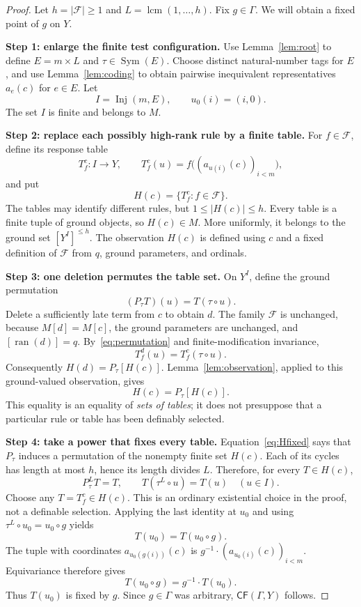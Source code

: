 \documentclass[11pt,letterpaper]{article}
\theoremstyle{definition}
\numberwithin{equation}{section}
\newcommand{\ran}{\operatorname{ran}}
\newcommand{\lcm}{\operatorname{lcm}}
\newcommand{\CF}{\mathsf{CF}}
\DeclareMathOperator{\Sym}{Sym}
\DeclareMathOperator{\Inj}{Inj}
\begin{document}
\begin{proof}
Let $h=|\mathcal F|\ge1$ and $L=\lcm(1,\ldots,h)$. Fix $g\in\Gamma$.
We will obtain a fixed point of $g$ on $Y$.

\textbf{Step 1: enlarge the finite test configuration.}
Use Lemma~\ref{lem:root} to define $E=m\times L$ and $\tau\in\Sym(E)$.
Choose distinct natural-number tags for $E$, and use
Lemma~\ref{lem:coding} to obtain pairwise inequivalent representatives
$a_e(c)$ for $e\in E$. Let
\[
 I=\Inj(m,E),\qquad u_0(i)=(i,0).
\]
The set $I$ is finite and belongs to $M$.

\textbf{Step 2: replace each possibly high-rank rule by a finite table.}
For $f\in\mathcal F$, define its response table
\[
 T_f^c:I\longrightarrow Y,\qquad
 T_f^c(u)=f\bigl((a_{u(i)}(c))_{i<m}\bigr),
\]
and put
\[
 H(c)=\{T_f^c:f\in\mathcal F\}.
\]
The tables may identify different rules, but
$1\le |H(c)|\le h$. Every table is a finite tuple of ground objects,
so $H(c)\in M$. More uniformly, it belongs to the ground set
$[Y^I]^{\le h}$. The observation $H(c)$ is defined using $c$ and a fixed
definition of $\mathcal F$ from $q$, ground parameters, and ordinals.

\textbf{Step 3: one deletion permutes the table set.}
On $Y^I$, define the ground permutation
\[
 (P_\tau T)(u)=T(\tau\circ u).
\]
Delete a sufficiently late term from $c$ to obtain $d$. The family
$\mathcal F$ is unchanged, because $M[d]=M[c]$, the ground parameters are
unchanged, and $[\ran(d)]=q$. By~\eqref{eq:permutation} and
finite-modification invariance,
\[
 T_f^d(u)=T_f^c(\tau\circ u).
\]
Consequently $H(d)=P_\tau[H(c)]$. Lemma~\ref{lem:observation}, applied
to this ground-valued observation, gives
\begin{equation}\label{eq:Hfixed}
 H(c)=P_\tau[H(c)].
\end{equation}
This equality is an equality of \emph{sets of tables}; it does not presuppose
that a particular rule or table has been definably selected.

\textbf{Step 4: take a power that fixes every table.}
Equation~\eqref{eq:Hfixed} says that $P_\tau$ induces a permutation of the
nonempty finite set $H(c)$. Each of its cycles has length at most $h$,
hence its length divides $L$. Therefore, for every $T\in H(c)$,
\[
 P_\tau^L T=T,\qquad
 T(\tau^L\circ u)=T(u)\quad(u\in I).
\]
Choose any $T=T_f^c\in H(c)$. This is an ordinary existential choice in
the proof, not a definable selection. Applying the last identity at $u_0$
and using $\tau^L\circ u_0=u_0\circ g$ yields
\[
 T(u_0)=T(u_0\circ g).
\]
The tuple with coordinates $a_{u_0(g(i))}(c)$ is
$g^{-1}\cdot(a_{u_0(i)}(c))_{i<m}$. Equivariance therefore gives
\[
 T(u_0\circ g)=g^{-1}\cdot T(u_0).
\]
Thus $T(u_0)$ is fixed by $g$. Since $g\in\Gamma$ was arbitrary,
$\CF(\Gamma,Y)$ follows.
\end{proof}
\end{document}
